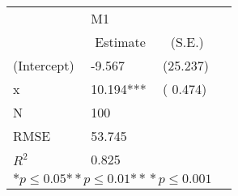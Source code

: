 \begin{tabular}{@{}l*{3}{l}@{}}
\hline
  &\multicolumn{2}{l}{M1  }\tabularnewline
 &\multicolumn{1}{c}{Estimate}&\multicolumn{1}{c}{(S.E.)}\tabularnewline
 \hline
 \hline
  (Intercept) & -9.567 & (25.237) \tabularnewline
  x & 10.194*** & ( 0.474) \tabularnewline
 \hline
 N&\multicolumn{1}{l}{100}  & \tabularnewline
 RMSE&53.745\tabularnewline
 $R^2$&0.825\tabularnewline
 \hline
\hline
 
 \multicolumn{3}{l}{  ${*  p}\le 0.05$${*\!\!*  p}\le 0.01$${*\!\!*\!\!*  p}\le 0.001$}\tabularnewline
 \end{tabular}